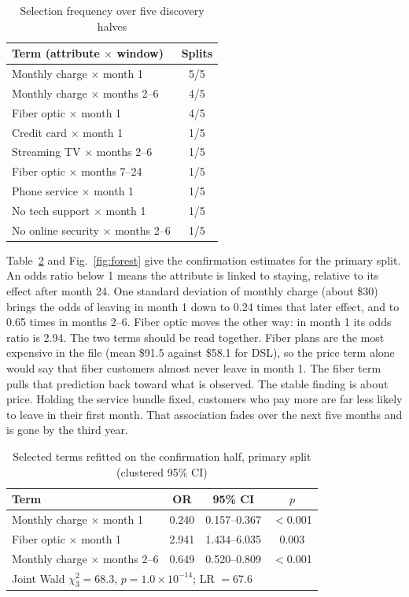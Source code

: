 \documentclass[conference]{IEEEtran}
\begin{document}
\begin{table}[t]
\caption{Selection frequency over five discovery halves}
\label{tab:freq}
\centering
\footnotesize
\begin{tabular}{lc}
\toprule
Term (attribute $\times$ window) & Splits \\
\midrule
Monthly charge $\times$ month 1 & 5/5 \\
Monthly charge $\times$ months 2--6 & 4/5 \\
Fiber optic $\times$ month 1 & 4/5 \\
Credit card $\times$ month 1 & 1/5 \\
Streaming TV $\times$ months 2--6 & 1/5 \\
Fiber optic $\times$ months 7--24 & 1/5 \\
Phone service $\times$ month 1 & 1/5 \\
No tech support $\times$ month 1 & 1/5 \\
No online security $\times$ months 2--6 & 1/5 \\
\bottomrule
\end{tabular}
\end{table}

Table~\ref{tab:confirm} and Fig.~\ref{fig:forest} give the confirmation estimates for the primary split. An odds ratio below 1 means the attribute is linked to staying, relative to its effect after month 24. One standard deviation of monthly charge (about \$30) brings the odds of leaving in month 1 down to 0.24 times that later effect, and to 0.65 times in months 2--6. Fiber optic moves the other way: in month 1 its odds ratio is 2.94. The two terms should be read together. Fiber plans are the most expensive in the file (mean \$91.5 against \$58.1 for DSL), so the price term alone would say that fiber customers almost never leave in month 1. The fiber term pulls that prediction back toward what is observed. The stable finding is about price. Holding the service bundle fixed, customers who pay more are far less likely to leave in their first month. That association fades over the next five months and is gone by the third year.

\begin{table}[t]
\caption{Selected terms refitted on the confirmation half, primary split (clustered 95\% CI)}
\label{tab:confirm}
\centering
\footnotesize
\begin{tabular}{lccc}
\toprule
Term & OR & 95\% CI & $p$ \\
\midrule
Monthly charge $\times$ month 1 & 0.240 & 0.157--0.367 & $<$0.001 \\
Fiber optic $\times$ month 1 & 2.941 & 1.434--6.035 & 0.003 \\
Monthly charge $\times$ months 2--6 & 0.649 & 0.520--0.809 & $<$0.001 \\
\midrule
\multicolumn{4}{l}{Joint Wald $\chi^2_3 = 68.3$, $p = 1.0\times10^{-14}$; LR $= 67.6$} \\
\bottomrule
\end{tabular}
\end{table}
\end{document}
